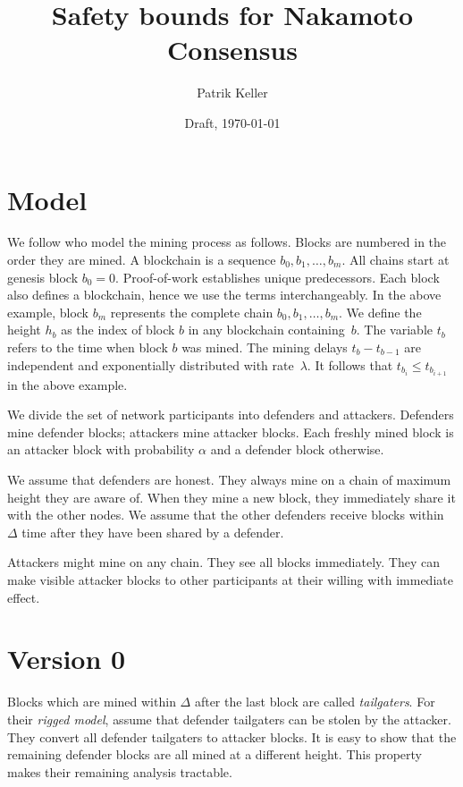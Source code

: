 \documentclass[12pt]{article}
\theoremstyle{definition}
\begin{document}
\title{Safety bounds for Nakamoto Consensus}
\author{Patrik Keller}
\date{Draft, \today}
\maketitle

\section{Model}

We follow \citet{guo2022BitcoinLatency} who model the mining process as follows.
Blocks are numbered in the order they are mined.
A blockchain is a sequence $b_0, b_1, \dots, b_m$.
All chains start at genesis block $b_0 = 0$.
Proof-of-work establishes unique predecessors.
Each block also defines a blockchain, hence we use the terms interchangeably.
In the above example, block $b_m$ represents the complete chain $b_0, b_1, \dots, b_m$.
We define the height $h_b$ as the index of block $b$ in any blockchain containing~$b$.
%
The variable $t_b$ refers to the time when block $b$ was mined.
The mining delays $t_b - t_{b-1}$ are independent and exponentially distributed with rate~$\lambda$.
It follows that $t_{b_i} \leq t_{b_{i+1}}$ in the above example.

We divide the set of network participants into defenders and attackers.
Defenders mine defender blocks; attackers mine attacker blocks.
Each freshly mined block is an attacker block with probability $\alpha$ and a defender block otherwise.

We assume that defenders are honest.
They always mine on a chain of maximum height they are aware of.
When they mine a new block, they immediately share it with the other nodes.
We assume that the other defenders receive blocks within $\Delta$ time after they have been shared by a defender.

Attackers might mine on any chain.
They see all blocks immediately.
They can make visible attacker blocks to other participants at their willing with immediate effect.

\section{Version 0} \label{sec:v0}

Blocks which are mined within $\Delta$ after the last block are called \emph{tailgaters}.
For their \emph{rigged model}, \citet{guo2022BitcoinLatency} assume that defender tailgaters can be stolen by the attacker.
They convert all defender tailgaters to attacker blocks.
It is easy to show that the remaining defender blocks are all mined at a different height.
This property makes their remaining analysis tractable.
\end{document}
